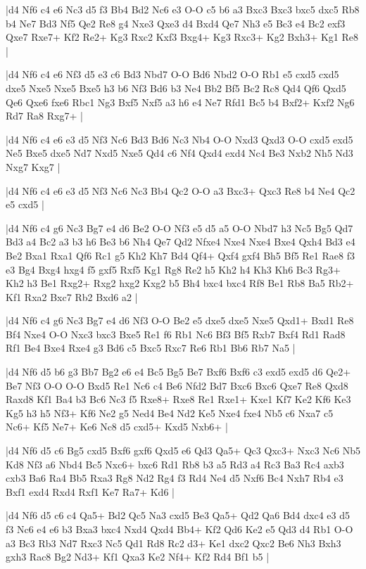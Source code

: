 \whitename{}
\blackname{}
\makegametitle
|d4 Nf6 c4 e6 Nc3 d5 f3 Bb4 Bd2 Nc6 e3 O-O c5 b6 a3 Bxc3 Bxc3 bxc5 dxc5 Rb8 b4 Ne7 Bd3 Nf5 Qe2 Re8 g4 Nxe3 Qxe3 d4 Bxd4 Qe7 Nh3 e5 Bc3 e4 Bc2 exf3 Qxe7 Rxe7+ Kf2 Re2+ Kg3 Rxc2 Kxf3 Bxg4+ Kg3 Rxc3+ Kg2 Bxh3+ Kg1 Re8  |

\whitename{}
\blackname{}
\makegametitle
|d4 Nf6 c4 e6 Nf3 d5 e3 c6 Bd3 Nbd7 O-O Bd6 Nbd2 O-O Rb1 e5 cxd5 cxd5 dxe5 Nxe5 Nxe5 Bxe5 h3 b6 Nf3 Bd6 b3 Ne4 Bb2 Bf5 Bc2 Rc8 Qd4 Qf6 Qxd5 Qe6 Qxe6 fxe6 Rbc1 Ng3 Bxf5 Nxf5 a3 h6 e4 Ne7 Rfd1 Bc5 b4 Bxf2+ Kxf2 Ng6 Rd7 Ra8 Rxg7+  |

\whitename{}
\blackname{}
\makegametitle
|d4 Nf6 c4 e6 e3 d5 Nf3 Nc6 Bd3 Bd6 Nc3 Nb4 O-O Nxd3 Qxd3 O-O cxd5 exd5 Ne5 Bxe5 dxe5 Nd7 Nxd5 Nxe5 Qd4 c6 Nf4 Qxd4 exd4 Nc4 Be3 Nxb2 Nh5 Nd3 Nxg7 Kxg7  |

\whitename{}
\blackname{}
\makegametitle
|d4 Nf6 c4 e6 e3 d5 Nf3 Nc6 Nc3 Bb4 Qc2 O-O a3 Bxc3+ Qxc3 Re8 b4 Ne4 Qc2 e5 cxd5  |

\whitename{}
\blackname{}
\makegametitle
|d4 Nf6 c4 g6 Nc3 Bg7 e4 d6 Be2 O-O Nf3 e5 d5 a5 O-O Nbd7 h3 Nc5 Bg5 Qd7 Bd3 a4 Bc2 a3 b3 h6 Be3 b6 Nh4 Qe7 Qd2 Nfxe4 Nxe4 Nxe4 Bxe4 Qxh4 Bd3 e4 Be2 Bxa1 Rxa1 Qf6 Rc1 g5 Kh2 Kh7 Bd4 Qf4+ Qxf4 gxf4 Bh5 Bf5 Re1 Rae8 f3 e3 Bg4 Bxg4 hxg4 f5 gxf5 Rxf5 Kg1 Rg8 Re2 h5 Kh2 h4 Kh3 Kh6 Bc3 Rg3+ Kh2 h3 Be1 Rxg2+ Rxg2 hxg2 Kxg2 b5 Bh4 bxc4 bxc4 Rf8 Be1 Rb8 Ba5 Rb2+ Kf1 Rxa2 Bxc7 Rb2 Bxd6 a2  |

\whitename{}
\blackname{}
\makegametitle
|d4 Nf6 c4 g6 Nc3 Bg7 e4 d6 Nf3 O-O Be2 e5 dxe5 dxe5 Nxe5 Qxd1+ Bxd1 Re8 Bf4 Nxe4 O-O Nxc3 bxc3 Bxe5 Re1 f6 Rb1 Nc6 Bf3 Bf5 Rxb7 Bxf4 Rd1 Rad8 Rf1 Be4 Bxe4 Rxe4 g3 Bd6 c5 Bxc5 Rxc7 Re6 Rb1 Bb6 Rb7 Na5  |

\whitename{}
\blackname{}
\makegametitle
|d4 Nf6 d5 b6 g3 Bb7 Bg2 e6 e4 Bc5 Bg5 Be7 Bxf6 Bxf6 c3 exd5 exd5 d6 Qe2+ Be7 Nf3 O-O O-O Bxd5 Re1 Nc6 c4 Be6 Nfd2 Bd7 Bxc6 Bxc6 Qxe7 Re8 Qxd8 Raxd8 Kf1 Ba4 b3 Bc6 Nc3 f5 Rxe8+ Rxe8 Re1 Rxe1+ Kxe1 Kf7 Ke2 Kf6 Ke3 Kg5 h3 h5 Nf3+ Kf6 Ne2 g5 Ned4 Be4 Nd2 Ke5 Nxe4 fxe4 Nb5 c6 Nxa7 c5 Nc6+ Kf5 Ne7+ Ke6 Nc8 d5 cxd5+ Kxd5 Nxb6+  |

\whitename{}
\blackname{}
\makegametitle
|d4 Nf6 d5 c6 Bg5 cxd5 Bxf6 gxf6 Qxd5 e6 Qd3 Qa5+ Qc3 Qxc3+ Nxc3 Nc6 Nb5 Kd8 Nf3 a6 Nbd4 Bc5 Nxc6+ bxc6 Rd1 Rb8 b3 a5 Rd3 a4 Rc3 Ba3 Rc4 axb3 cxb3 Ba6 Ra4 Bb5 Rxa3 Rg8 Nd2 Rg4 f3 Rd4 Ne4 d5 Nxf6 Bc4 Nxh7 Rb4 e3 Bxf1 exd4 Rxd4 Rxf1 Ke7 Ra7+ Kd6  |

\whitename{}
\blackname{}
\makegametitle
|d4 Nf6 d5 c6 c4 Qa5+ Bd2 Qc5 Na3 cxd5 Be3 Qa5+ Qd2 Qa6 Bd4 dxc4 e3 d5 f3 Nc6 e4 e6 b3 Bxa3 bxc4 Nxd4 Qxd4 Bb4+ Kf2 Qd6 Ke2 e5 Qd3 d4 Rb1 O-O a3 Bc3 Rb3 Nd7 Rxc3 Nc5 Qd1 Rd8 Rc2 d3+ Ke1 dxc2 Qxc2 Be6 Nh3 Bxh3 gxh3 Rac8 Bg2 Nd3+ Kf1 Qxa3 Ke2 Nf4+ Kf2 Rd4 Bf1 b5  |

